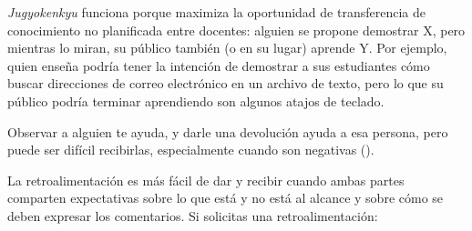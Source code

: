 \emph{Jugyokenkyu} funciona porque maximiza la oportunidad de transferencia de conocimiento no planificada entre docentes:
alguien se propone demostrar X,
pero mientras lo miran,
su público también (o en su lugar) aprende Y.
Por ejemplo,
quien enseña podría tener la intención de demostrar a sus estudiantes cómo buscar direcciones de correo electrónico en un archivo de texto,
pero lo que su público podría terminar aprendiendo son algunos atajos de teclado.


Observar a alguien te ayuda,
y darle una devolución ayuda a esa persona,
pero puede ser difícil recibirlas,
especialmente cuando son negativas ().


La retroalimentación es más fácil de dar y recibir cuando ambas partes comparten expectativas
sobre lo que está y no está al alcance
y sobre cómo se deben expresar los comentarios.
Si solicitas una retroalimentación:

